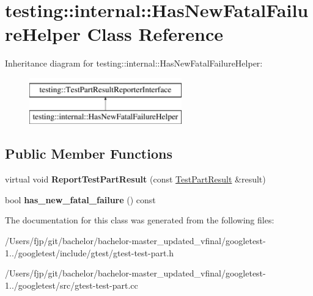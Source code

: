 \hypertarget{classtesting_1_1internal_1_1_has_new_fatal_failure_helper}{}\section{testing\+:\+:internal\+:\+:Has\+New\+Fatal\+Failure\+Helper Class Reference}
\label{classtesting_1_1internal_1_1_has_new_fatal_failure_helper}
Inheritance diagram for testing\+:\+:internal\+:\+:Has\+New\+Fatal\+Failure\+Helper\+:\begin{figure}[H]
\begin{center}
\leavevmode
\includegraphics[height=2.000000cm]{classtesting_1_1internal_1_1_has_new_fatal_failure_helper}
\end{center}
\end{figure}
\subsection*{Public Member Functions}
\begin{DoxyCompactItemize}
\item 
\mbox{\label{classtesting_1_1internal_1_1_has_new_fatal_failure_helper_a2d2e1faa1f3669b82810df97ac678a27}} 
virtual void {\bfseries Report\+Test\+Part\+Result} (const \mbox{\hyperlink{classtesting_1_1_test_part_result}{Test\+Part\+Result}} \&result)
\item 
\mbox{\label{classtesting_1_1internal_1_1_has_new_fatal_failure_helper_a91b7bac47f09076db4be0304a2110a9e}} 
bool {\bfseries has\+\_\+new\+\_\+fatal\+\_\+failure} () const
\end{DoxyCompactItemize}


The documentation for this class was generated from the following files\+:\begin{DoxyCompactItemize}
\item 
/\+Users/fjp/git/bachelor/bachelor-\/master\+\_\+updated\+\_\+vfinal/googletest-\/1../googletest/include/gtest/gtest-\/test-\/part.\+h\item 
/\+Users/fjp/git/bachelor/bachelor-\/master\+\_\+updated\+\_\+vfinal/googletest-\/1../googletest/src/gtest-\/test-\/part.\+cc\end{DoxyCompactItemize}
